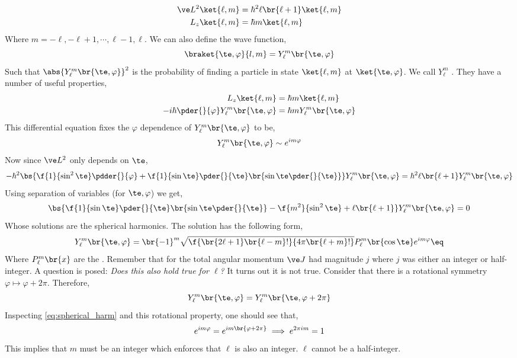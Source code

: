 \documentclass{article}
\begin{document}
\begin{align*}
    \ve L^2 \ket{\ell, m} &= \hbar^2 \ell \br{\ell + 1} \ket{\ell, m} \\
    L_z \ket{\ell, m} &= \hbar m \ket{\ell, m}
\end{align*}
Where $m = -\ell, -\ell +1, \cdots, \ell - 1, \ell$. We can also define the wave function,
\[ \braket{\te ,\varphi}{l,m} = Y^{m}_{\ell}\br{\te, \varphi} \]
Such that $\abs{Y^{m}_{\ell}\br{\te, \varphi}}^2$ is the probability of finding a particle in state $\ket{\ell, m}$ at $\ket{\te, \varphi}$. We call $Y^{m}_{\ell}$ . They have a number of useful properties,
\begin{align*}
L_z \ket{\ell, m} &= \hbar m \ket{\ell, m} \\
- i \hbar \pder{}{\varphi} Y_{\ell}^{m}\br{\te, \varphi} &= \hbar m Y_{\ell}^{m}\br{\te, \varphi}
\end{align*}
This differential equation fixes the $\varphi$ dependence of $Y_{\ell}^{m}\br{\te, \varphi}$ to be,
\[ Y_{\ell}^{m}\br{\te, \varphi} \sim e^{i m \varphi} \]
Now since $\ve L^2$ only depends on $\te$,
\begin{align*}
    - \hbar^2 \bs{\f{1}{\sin^2 \te} \pdder{}{\varphi} + \f{1}{\sin \te} \pder{}{\te} \br{\sin \te \pder{}{\te}}} Y_{\ell}^{m}\br{\te, \varphi} = \hbar^2 \ell \br{\ell+1}Y_{\ell}^{m}\br{\te, \varphi}
\end{align*}
Using separation of variables (for $\te, \varphi$) we get,
\[ \bs{\f{1}{\sin \te }\pder{}{\te}\br{\sin \te \pder{}{\te}} - \f{m^2}{\sin^2 \te} + \ell \br{\ell+1 }}Y_{\ell}^{m}\br{\te, \varphi} = 0 \]
Whose solutions are the spherical harmonics. The solution has the following form,
\[ Y_{\ell}^{m}\br{\te, \varphi} = \br{-1}^{m} \sqrt{\f{\br{2 \ell + 1}\br{\ell - m}!}{4 \pi \br{\ell + m }!}} P_{\ell}^{m}\br{\cos \te} e^{i m \varphi} \eq \label{eq:spherical_harm}\]
Where $P_{\ell}^{m}\br{x}$ are the . Remember that for the total angular momentum $\ve J$ had magnitude $j$ where $j$ was either an integer or half-integer. A question is posed: \textit{Does this also hold true for $\ell$?} It turns out it is not true. Consider that there is a rotational symmetry $\varphi \mapsto \varphi + 2\pi$. Therefore,
\[ Y_{\ell}^{m}\br{\te, \varphi} = Y_{\ell}^{m}\br{\te, \varphi + 2 \pi} \]
Inspecting \cref{eq:spherical_harm} and this rotational property, one should see that,
\[ e^{im\varphi} = e^{im\br{\varphi + 2 \pi}} \implies e^{2 \pi i m} = 1 \]
This implies that $m$ must be an integer which enforces that $\ell$ is also an integer. $\ell$ cannot be a half-integer.
\end{document}
